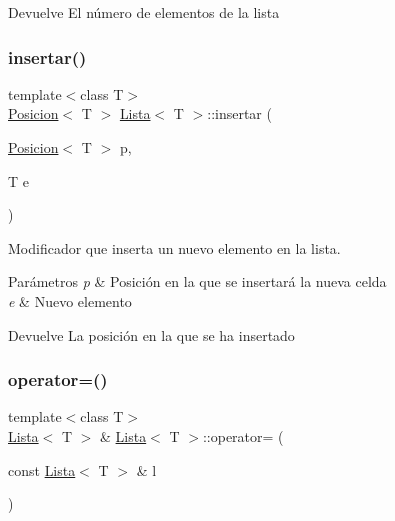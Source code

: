 \begin{DoxyReturn}{Devuelve}
El número de elementos de la lista 
\end{DoxyReturn}
\mbox{\label{classLista_a3ecb3ea6a48f28863bfb99c2f3d59a9d}} 
\subsubsection{\texorpdfstring{insertar()}{insertar()}}
{\footnotesize\ttfamily template$<$class T$>$ \\
\mbox{\hyperlink{classPosicion}{Posicion}}$<$ T $>$ \mbox{\hyperlink{classLista}{Lista}}$<$ T $>$\+::insertar (\begin{DoxyParamCaption}\item[{\mbox{\hyperlink{classPosicion}{Posicion}}$<$ T $>$}]{p,  }\item[{T}]{e }\end{DoxyParamCaption})}



Modificador que inserta un nuevo elemento en la lista. 


\begin{DoxyParams}{Parámetros}
{\em p} & Posición en la que se insertará la nueva celda \\
\hline
{\em e} & Nuevo elemento \\
\hline
\end{DoxyParams}
\begin{DoxyReturn}{Devuelve}
La posición en la que se ha insertado 
\end{DoxyReturn}
\mbox{\label{classLista_a1f2c4d3a18401f03c216b0bbb7da41fc}} 
\subsubsection{\texorpdfstring{operator=()}{operator=()}}
{\footnotesize\ttfamily template$<$class T$>$ \\
\mbox{\hyperlink{classLista}{Lista}}$<$ T $>$ \& \mbox{\hyperlink{classLista}{Lista}}$<$ T $>$\+::operator= (\begin{DoxyParamCaption}\item[{const \mbox{\hyperlink{classLista}{Lista}}$<$ T $>$ \&}]{l }\end{DoxyParamCaption})}



